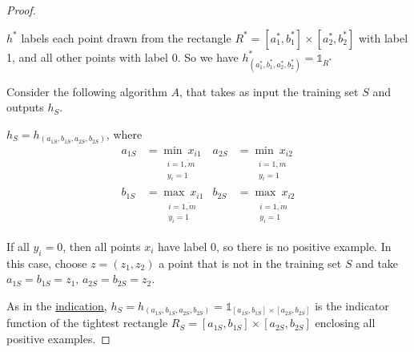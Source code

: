\documentclass{article}
\newcommand{\<}{\langle}
\renewcommand{\>}{\rangle}
\theoremstyle{definition}
\def\sone{{\mathds{1}}}
\newcommand{\uset}{\underset}
\newcommand{\hs}{h_S}
\def\sone{{\mathds{1}}}
\newcommand{\uset}{\underset}
\newcommand{\hs}{h_S}
\begin{document}
\begin{proof}
\begin{figure}[h]
\end{figure}

$h^*$ labels each point drawn from the rectangle
$R^* = [a_1^*, b_1^*] \times [a_2^*, b_2^*]$ with label 1, and all other points with label 0.
So we have $h_{(a_1^*, b_1^*, a_2^*, b_2^*)}^* = \sone_{R^*}$

Consider the following algorithm $A$, that takes as input the training set $S$
and outputs $\hs$.

$h_S = h_{(a_{1S}, b_{1S}, a_{2S}, b_{2S})}$, where
\begin{align*}
  a_{1S} &= \uset{\substack{i=\overline{1,m} \\ y_i=1}}{\min\ x_{i1}}
  &a_{2S} &= \uset{\substack{i=\overline{1,m} \\ y_i=1}}{\min\ x_{i2}} \\
  b_{1S} &= \uset{\substack{i=\overline{1,m} \\ y_i=1}}{\max\ x_{i1}}
  &b_{2S} &= \uset{\substack{i=\overline{1,m} \\ y_i=1}}{\max\ x_{i2}}
\end{align*}

If all $y_i = 0$, then all points $x_i$ have label 0, so there is no positive example.
In this case, choose $z = (z_1, z_2)$ a point that is not in the training set $S$ and
take $a_{1S} = b_{1S} = z_1,\, a_{2S} = b_{2S} = z_2$.

As in the \underline{indication},
$\hs = h_{(a_{1S}, b_{1S}, a_{2S}, b_{2S})} = \sone_{[a_{1S}, b_{1S}] \times [a_{2S}, b_{2S}]}$
is the indicator function of the tightest rectangle
$R_S = [a_{1S}, b_{1S}] \times [a_{2S}, b_{2S}]$ enclosing all positive examples.


\end{proof}
\end{document}
